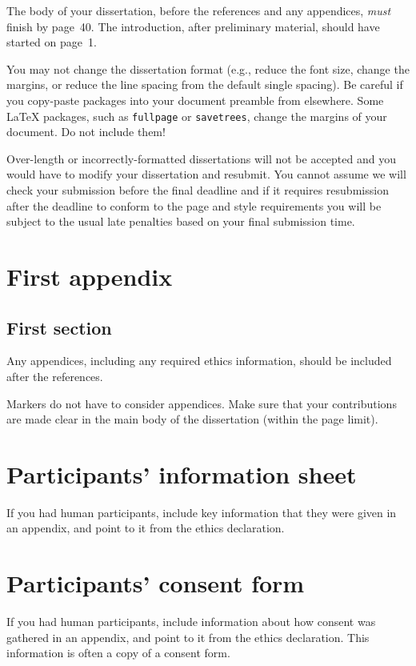 \documentclass[logo,bsc,singlespacing,parskip,online]{infthesis}
\begin{document}
The body of your dissertation, before the references and any appendices,
\emph{must} finish by page~40. The introduction, after preliminary material,
should have started on page~1.

You may not change the dissertation format (e.g., reduce the font size, change
the margins, or reduce the line spacing from the default single spacing). Be
careful if you copy-paste packages into your document preamble from elsewhere.
Some \LaTeX{} packages, such as \texttt{fullpage} or \texttt{savetrees}, change
the margins of your document. Do not include them!

Over-length or incorrectly-formatted dissertations will not be accepted and you
would have to modify your dissertation and resubmit. You cannot assume we will
check your submission before the final deadline and if it requires resubmission
after the deadline to conform to the page and style requirements you will be
subject to the usual late penalties based on your final submission time.

% 




\appendix

\chapter{First appendix}

\section{First section}

Any appendices, including any required ethics information, should be included
after the references.

Markers do not have to consider appendices. Make sure that your contributions
are made clear in the main body of the dissertation (within the page limit).

\chapter{Participants' information sheet}

If you had human participants, include key information that they were given in
an appendix, and point to it from the ethics declaration.

\chapter{Participants' consent form}

If you had human participants, include information about how consent was
gathered in an appendix, and point to it from the ethics declaration.
This information is often a copy of a consent form.
\end{document}
